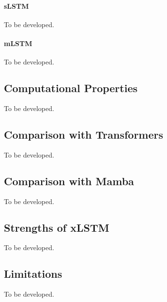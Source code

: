 \documentclass[11pt, oneside]{book}
\let\originalsubsection\subsection
\renewcommand{\subsection}{\Needspace{6\baselineskip}\originalsubsection}
\begin{document}
\paragraph{sLSTM}\label{sec:source-8-1-4-1}
{\small\color{gray!70!black} To be developed.}

\paragraph{mLSTM}\label{sec:source-8-1-4-2}
{\small\color{gray!70!black} To be developed.}

\subsection{Computational Properties}\label{sec:source-8-1-5}
{\small\color{gray!70!black} To be developed.}

\subsection{Comparison with Transformers}\label{sec:source-8-1-6}
{\small\color{gray!70!black} To be developed.}

\subsection{Comparison with Mamba}\label{sec:source-8-1-7}
{\small\color{gray!70!black} To be developed.}

\subsection{Strengths of xLSTM}\label{sec:source-8-1-8}
{\small\color{gray!70!black} To be developed.}

\subsection{Limitations}\label{sec:source-8-1-9}
{\small\color{gray!70!black} To be developed.}
\end{document}
